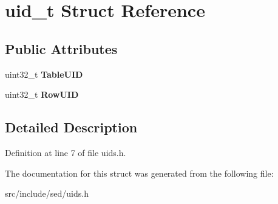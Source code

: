 \hypertarget{structuid__t}{}\section{uid\+\_\+t Struct Reference}
\label{structuid__t}
\subsection*{Public Attributes}
\begin{DoxyCompactItemize}
\item 
\hypertarget{structuid__t_aa6b897404c62a52b2c4a48d81cdbd6eb}{}uint32\+\_\+t {\bfseries Table\+U\+I\+D}\label{structuid__t_aa6b897404c62a52b2c4a48d81cdbd6eb}

\item 
\hypertarget{structuid__t_ae87dd61ade92355e9af8e778a0f12dd2}{}uint32\+\_\+t {\bfseries Row\+U\+I\+D}\label{structuid__t_ae87dd61ade92355e9af8e778a0f12dd2}

\end{DoxyCompactItemize}


\subsection{Detailed Description}


Definition at line 7 of file uids.\+h.



The documentation for this struct was generated from the following file\+:\begin{DoxyCompactItemize}
\item 
src/include/sed/uids.\+h\end{DoxyCompactItemize}
